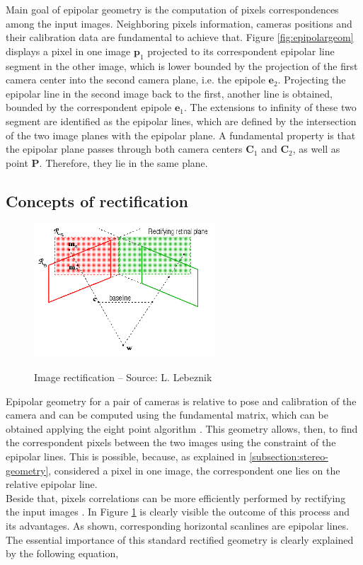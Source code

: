 Main goal of epipolar geometry is the computation of pixels correspondences among the input images. 
Neighboring pixels information, cameras positions and their calibration data are fundamental to achieve that.
Figure \ref{fig:epipolargeom} displays a pixel in one image $\mathbf{p}_1$ projected to its correspondent epipolar line segment in the other image, which is lower bounded by the projection of the first camera center into the second camera plane, i.e. the epipole $\mathbf{e}_2$. 
Projecting the epipolar line in the second image back to the first, another line is obtained, bounded by the correspondent epipole $\mathbf{e}_1$. 
The extensions to infinity of these two segment are identified as the epipolar lines, which are defined by the intersection of the two image planes with the epipolar plane.
A fundamental property is that the epipolar plane passes through both camera centers $\mathbf{C}_1$ and $\mathbf{C}_2$, as well as point $\mathbf{P}$. 
Therefore, they lie in the same plane. \\

\subsection{Concepts of rectification}
\label{subsection:rectification-basics}

\begin{figure}[t]
	\begin{center}
		{\includegraphics[width=.8\textwidth, height=5cm, keepaspectratio]{images/rectification}}
\caption{Image rectification -- Source: L. Lebeznik}
\label{fig:rectification}
	\end{center}
\end{figure}

Epipolar geometry for a pair of cameras is relative to pose and calibration of the camera and can be computed using the fundamental matrix, which can be obtained applying the eight point algorithm \cite{hartley2004multiple}.
This geometry allows, then, to find the correspondent pixels between the two images using the constraint of the epipolar lines.
This is possible, because, as explained in \ref{subsection:stereo-geometry}, considered a pixel in one image, the correspondent one lies on the relative epipolar line.\\
Beside that, pixels correlations can be more efficiently performed by rectifying the input images \cite{hartley2004multiple}.
In Figure \ref{fig:rectification} is clearly visible the outcome of this process and its advantages.
As shown, corresponding horizontal scanlines are epipolar lines. 
The essential importance of this standard rectified geometry is clearly explained by the following equation,

